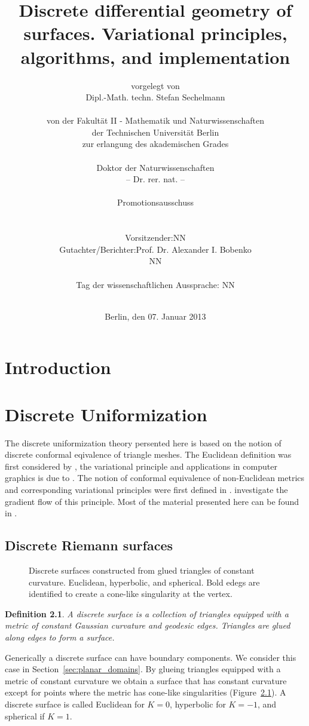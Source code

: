 \documentclass{book}
\title{Discrete differential geometry of surfaces. Variational principles, algorithms, and implementation}
\author{
vorgelegt von\\
Dipl.-Math. techn. Stefan Sechelmann\\
\vspace{0.3cm}\\
von der Fakult{\"a}t II - Mathematik und Naturwissenschaften\\
der Technischen Universit{\"a}t Berlin\\
zur erlangung des akademischen Grades\\
\vspace{0.3cm}\\
Doktor der Naturwissenschaften\\
-- Dr. rer. nat. --\\
\vspace{2cm}\\
Promotionsausschuss\\
\vspace{0.3cm}\\
\begin{tabular}{rl}
Vorsitzender: & NN \\
Gutachter/Berichter: & Prof. Dr. Alexander I. Bobenko \\
& NN 
\end{tabular}
\vspace{0.3cm}\\
Tag der wissenschaftlichen Aussprache: NN\\
\vspace{2cm}\\
}
\date{Berlin, den 07. Januar 2013}
\newtheorem{definition}{Definition}
\begin{document}
\frontmatter
\maketitle
\newpage

\tableofcontents
\newpage
\listoffigures

\newpage
\mainmatter
\chapter{Introduction}


\chapter{Discrete Uniformization}

The discrete uniformization theory persented here is based on the notion of discrete conformal eqivalence of triangle meshes. The Euclidean definition was first considered by \cite{Luo2004}, the variational principle and applications in computer graphics is due to \cite{Springborn2008, Bobenko2010}. The notion of conformal equivalence of non-Euclidean metrics and corresponding variational principles were first defined in \cite{Bobenko2010}. \cite{Guo2010} investigate the gradient flow of this principle.
Most of the material presented here can be found in \cite{BobSechSpr}.

\section{Discrete Riemann surfaces}

\begin{figure}
\centering
\scalebox{0.8}{}
\caption{Discrete surfaces constructed from glued triangles of constant curvature. Euclidean, hyperbolic, and spherical. Bold edegs are identified to create a cone-like singularity at the vertex.}
\label{fig:surface_triangles}
\end{figure}

\begin{definition}
A \emph{discrete surface} is a collection of triangles equipped with a metric of constant Gaussian curvature and geodesic edges. Triangles are glued along edges to form a surface.
\end{definition}

Generically a discrete surface can have boundary components. We consider this case in Section~\ref{sec:planar_domains}. By glueing triangles equipped with a metric of constant curvature we obtain a surface that has constant curvature except for points where the metric has cone-like singularities (Figure~\ref{fig:surface_triangles}). A discrete surface is called Euclidean for $K=0$, hyperbolic for $K=-1$, and spherical if $K=1$.
\end{document}
